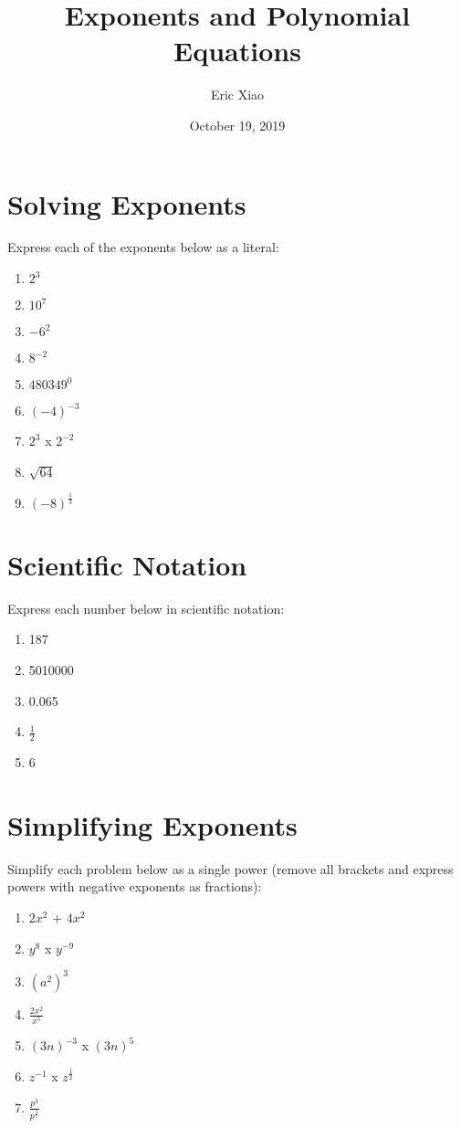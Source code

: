 \documentclass{article}
\title{\textbf{Exponents and Polynomial Equations}}
\author{Eric Xiao}
\date{October 19, 2019}
\begin{document}
\maketitleg

\section{Solving Exponents}
{Express each of the exponents below as a literal:}
\begin{enumerate}
    \itemsep1.0em
    \item {$2^3$}
    
    \item {$10^7$}
    
    \item {$-6^2$}
    
    \item {$8^{-2}$}
    
    \item {$480349^0$}
    
    \item {$(-4)^{-3}$}
    
    \item {$2^3$ x $2^{-2}$}
    
    \item {$\sqrt{64}$}
    
    \item {$(-8)^\frac{1}{3}$}
\end{enumerate}

\section{Scientific Notation}
{Express each number below in scientific notation:}
\begin{enumerate}
    \item {187}
    \item {5010000}
    \item {0.065}
    \item {$\frac{1}{2}$}
    \item {6}
\end{enumerate}

\section{Simplifying Exponents}
{Simplify each problem below as a single power (remove all brackets and express powers with negative exponents as fractions):}
\begin{enumerate}
    \itemsep1.0em
    \item {$2x^2$ + $4x^2$}
    
    \item {$y^8$ x $y^{-9}$}
    
    \item {$(a^2)^3$}
    
    \item {$\frac{2x^2}{x^5}$}
    
    \item {$(3n)^{-3}$ x $(3n)^5$}
    
    \item {$z^{-1}$ x $z^\frac{1}{2}$}
    
    \item {$\frac{p^3}{p^\frac{4}{5}}$}
    
\end{enumerate}
\end{document}
